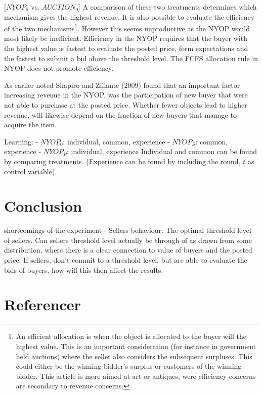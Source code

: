\documentclass[a4paper,12pt]{article}
\begin{document}
	[$NYOP_0$ vs. $AUCTION_0$]
	A comparison of these two treatments determines which mechanism gives the highest revenue. It is also possible to evaluate the efficiency of the two mechanisms\footnote{\label{footnote:efficient}An efficient allocation is when the object is allocated to the buyer will the highest value. This is an important consideration (for instance in government held auctions) where the seller also considers the subsequent surpluses. This could either be the winning bidder's surplus or customers of the winning bidder. This article is more aimed at art or antiques, were efficiency concerns are secondary to revenue concerns.}. However this seems unproductive as the NYOP would most likely be inefficient. Efficiency in the NYOP requires that the buyer with the highest value is fastest to evaluate the posted price, form expectations and the fastest to submit a bid above the threshold level. The FCFS allocation rule in NYOP does not promote efficiency. 
	
As earlier noted Shapiro and Zillante (2009) found that an important factor increasing revenue in the NYOP, was the participation of new buyer that were not able to purchase at the posted price. Whether fewer objects lead to higher revenue, will likewise depend on the fraction of new buyers that manage to acquire the item.

	Learning: 
	- $NYOP_0$: individual, common, experience
	- $NYOP_S$: common, experience
	- $NYOP_P$: individual, experience
	Individual and common can be found by comparing treatments. (Experience can be found by including the round, $t$ as control variable).
	
	\section{Conclusion}
			
	shortcomings of the experiment
	- Sellers behaviour: The optimal threshold level of sellers. Can sellers threshold level actually be through of as drawn from some distribution, where there is a clear connection to value of buyers and the posted price. If sellers, don't commit to a threshold level, but are able to evaluate the bids of buyers, how will this then affect the results.
	
			
	\newpage
	\appendix
	
	\begingroup
		\section{Referencer}
		
		\nocite{*}
		\renewcommand{\section}[2]{}%
		\raggedright
		
%
%
	\endgroup
	
\end{document}
